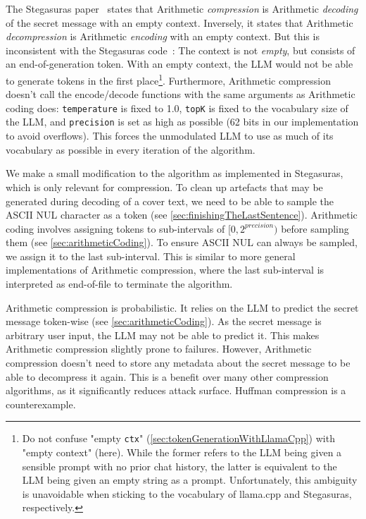 The Stegasuras paper~\cite{zieglerNeuralLinguisticSteganography2019} states that Arithmetic \textit{compression} is Arithmetic \textit{decoding} of the secret message with an empty context. Inversely, it states that Arithmetic \textit{decompression} is Arithmetic \textit{encoding} with an empty context. But this is inconsistent with the Stegasuras code~\cite{zieglerHarvardnlpNeuralSteganography2025}: The context is not \textit{empty}, but consists of an end-of-generation token. With an empty context, the \gls{LLM} would not be able to generate tokens in the first place\footnote{Do not confuse "empty \lstinline|ctx|" (\cref{sec:tokenGenerationWithLlamaCpp}) with "empty context" (here). While the former refers to the \gls{LLM} being given a sensible prompt with no prior chat history, the latter is equivalent to the \gls{LLM} being given an empty string as a prompt. Unfortunately, this ambiguity is unavoidable when sticking to the vocabulary of llama.cpp and Stegasuras, respectively.}. Furthermore, Arithmetic compression doesn't call the encode/decode functions with the same arguments as Arithmetic coding does: \lstinline|temperature| is fixed to 1.0, \lstinline|topK| is fixed to the vocabulary size of the \gls{LLM}, and \lstinline|precision| is set as high as possible (62 bits in our implementation to avoid overflows). This forces the unmodulated \gls{LLM} to use as much of its vocabulary as possible in every iteration of the algorithm.

We make a small modification to the algorithm as implemented in Stegasuras, which is only relevant for compression. To clean up artefacts that may be generated during decoding of a cover text, we need to be able to sample the ASCII NUL character as a token (see \cref{sec:finishingTheLastSentence}). Arithmetic coding involves assigning tokens to sub-intervals of $ [0, 2^{precision}) $ before sampling them (see \cref{sec:arithmeticCoding}). To ensure ASCII NUL can always be sampled, we assign it to the last sub-interval. This is similar to more general implementations of Arithmetic compression, where the last sub-interval is interpreted as end-of-file to terminate the algorithm.

Arithmetic compression is probabilistic. It relies on the \gls{LLM} to predict the secret message token-wise (see \cref{sec:arithmeticCoding}). As the secret message is arbitrary user input, the \gls{LLM} may not be able to predict it. This makes Arithmetic compression slightly prone to failures. However, Arithmetic compression doesn't need to store any metadata about the secret message to be able to decompress it again. This is a benefit over many other compression algorithms, as it significantly reduces attack surface. Huffman compression is a counterexample.

